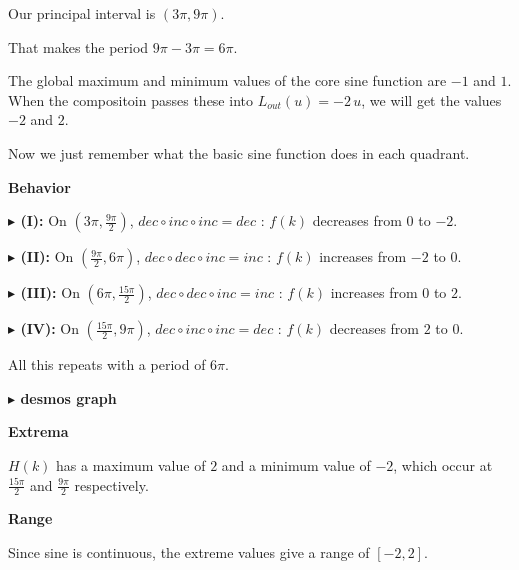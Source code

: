 \documentclass{ximera}
\begin{document}
\begin{example}
Our principal interval is $\left( 3 \pi, 9 \pi \right)$.

That makes the period $9 \pi - 3 \pi = 6 \pi$.



The global maximum and minimum values of the core sine function are $-1$ and $1$. When the compositoin passes these into $L_{out}(u) = -2 \, u$, we will get the values $-2$ and $2$.




Now we just remember what the basic sine function does in each quadrant. 



\textbf{\textcolor{blue!55!black}{Behavior}} 



\textbf{\textcolor{blue!55!black}{$\blacktriangleright$ (I):}} On $\left( 3 \pi, \frac{9\pi}{2} \right)$, $dec \circ inc \circ inc = dec$ : $f(k)$ decreases from $0$ to $-2$.



\textbf{\textcolor{blue!55!black}{$\blacktriangleright$ (II):}} On $\left( \frac{9\pi}{2}, 6 \pi \right)$, $dec \circ dec \circ inc = inc$ : $f(k)$ increases from $-2$ to $0$.



\textbf{\textcolor{blue!55!black}{$\blacktriangleright$ (III):}} On $\left( 6 \pi, \frac{15\pi}{2} \right)$, $dec \circ dec \circ inc = inc$ : $f(k)$ increases from $0$ to $2$.


\textbf{\textcolor{blue!55!black}{$\blacktriangleright$ (IV):}} On $\left( \frac{15\pi}{2}, 9 \pi \right)$, $dec \circ inc \circ inc = dec$ : $f(k)$ decreases from $2$ to $0$.



All this repeats with a period of $6 \pi$.







\textbf{\textcolor{blue!55!black}{$\blacktriangleright$ desmos graph}} 
\begin{center}
\end{center}






\textbf{\textcolor{blue!55!black}{Extrema}} 



$H(k)$ has a maximum value of $2$ and a minimum value of $-2$, which occur at $\frac{15\pi}{2}$ and $\frac{9\pi}{2}$ respectively.





\textbf{\textcolor{blue!55!black}{Range}} 


Since sine is continuous, the extreme values give a range of $[-2,2]$.





\end{example}
\end{document}
